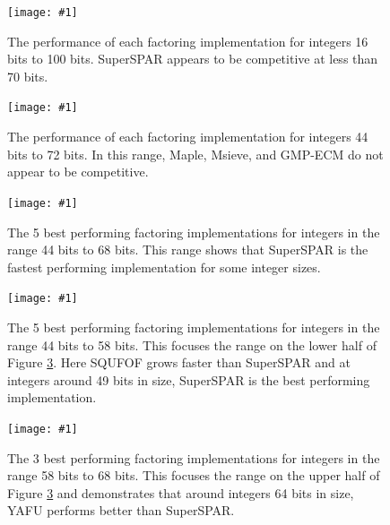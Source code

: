 \documentclass{ucalgthes1}
\theoremstyle{definition}
\newcommand{\mygraphX}[4]{
	\begin{figure}[htb]
	\centering
	\texttt{[image: \#1]}
	\caption[#4]{#3}
	\label{#2}
	\end{figure}
}
\begin{document}
\mygraphX{factoring-all.eps}{fig:factoring1}{The performance of each factoring implementation for integers 16 bits to 100 bits.  SuperSPAR appears to be competitive at less than 70 bits.}{Factoring performance for 16 bits to 100 bits.}
\mygraphX{factoring-all-44-72.eps}{fig:factoring2}{The performance of each factoring implementation for integers 44 bits to 72 bits.  In this range, Maple, Msieve, and GMP-ECM do not appear to be competitive.}{Factoring performance for 44 bits to 72 bits.}
\mygraphX{factoring-small-44-68.eps}{fig:factoring3}{The 5 best performing factoring implementations for integers in the range 44 bits to 68 bits.  This range shows that SuperSPAR is the fastest performing implementation for some integer sizes.}{Best factoring implementations for 44 bits to 68 bits.}
\mygraphX{factoring-small-44-58.eps}{fig:factoring4}{The 5 best performing factoring implementations for integers in the range 44 bits to 58 bits.  This focuses the range on the lower half of Figure \ref{fig:factoring3}.  Here SQUFOF grows faster than SuperSPAR and at integers around 49 bits in size, SuperSPAR is the best performing implementation.}{Best factoring implementations for 44 bits to 58 bits.}
\mygraphX{factoring-small-58-68.eps}{fig:factoring5}{The 3 best performing factoring implementations for integers in the range 58 bits to 68 bits.  This focuses the range on the upper half of Figure \ref{fig:factoring3} and demonstrates that around integers 64 bits in size, YAFU performs better than SuperSPAR.}{Best factoring implementations for 58 bits to 68 bits.}
\end{document}
